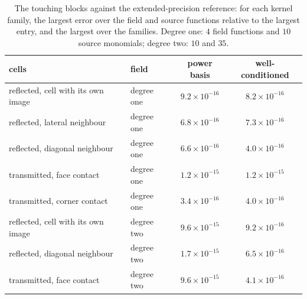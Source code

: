 \documentclass[11pt,a4paper]{article}
\begin{document}
\begin{table}[h]
\centering
\small
\begin{tabular}{llcc}
\toprule
cells & field & power basis & well-conditioned \\
\midrule
reflected, cell with its own image & degree one & $9.2\times10^{-16}$ & $8.2\times10^{-16}$ \\
reflected, lateral neighbour       & degree one & $6.8\times10^{-16}$ & $7.3\times10^{-16}$ \\
reflected, diagonal neighbour      & degree one & $6.6\times10^{-16}$ & $4.0\times10^{-16}$ \\
transmitted, face contact          & degree one & $1.2\times10^{-15}$ & $1.2\times10^{-15}$ \\
transmitted, corner contact        & degree one & $3.4\times10^{-16}$ & $4.0\times10^{-16}$ \\
reflected, cell with its own image & degree two & $9.6\times10^{-15}$ & $9.2\times10^{-16}$ \\
reflected, diagonal neighbour      & degree two & $1.7\times10^{-15}$ & $6.5\times10^{-16}$ \\
transmitted, face contact          & degree two & $9.6\times10^{-15}$ & $4.1\times10^{-16}$ \\
\bottomrule
\end{tabular}
\caption{The touching blocks against the extended-precision reference: for each kernel family, the largest
error over the field and source functions relative to the largest entry, and the largest over the
families. Degree one: $4$ field functions and $10$ source monomials; degree two: $10$ and $35$.}
\label{tab:bases}
\end{table}
\end{document}
